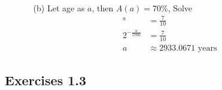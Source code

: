 \begin{enumerate}
\begin{itemize}
\begin{align*}
                 \end{align*}
             \item[(b)] Let age as $a$, then $A(a)=70\%$, Solve
                 \begin{align*}
                     [1-(1-2^{-\frac{1}{5700}})]^{a} & =\frac{7}{10} \\
                                 2^{-\frac{a}{5700}} & =\frac{7}{10} \\
                                 a & \approx 2933.0671\text{ years}
                \end{align*}
        \end{itemize}
\end{enumerate}

\subsection{Exercises 1.3}
